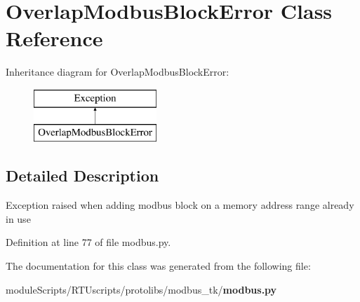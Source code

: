 \section{Overlap\+Modbus\+Block\+Error Class Reference}
\label{classprotolibs_1_1modbus__tk_1_1modbus_1_1_overlap_modbus_block_error}
Inheritance diagram for Overlap\+Modbus\+Block\+Error\+:\begin{figure}[H]
\begin{center}
\leavevmode
\includegraphics[height=2.000000cm]{classprotolibs_1_1modbus__tk_1_1modbus_1_1_overlap_modbus_block_error}
\end{center}
\end{figure}


\subsection{Detailed Description}
\begin{DoxyVerb}Exception raised when adding modbus block on a memory address
range already in use
\end{DoxyVerb}
 

Definition at line 77 of file modbus.\+py.



The documentation for this class was generated from the following file\+:\begin{DoxyCompactItemize}
\item 
module\+Scripts/\+R\+T\+Uscripts/protolibs/modbus\+\_\+tk/{\bf modbus.\+py}\end{DoxyCompactItemize}
